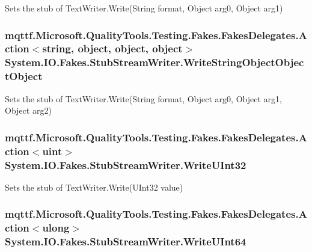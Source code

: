 Sets the stub of Text\-Writer.\-Write(\-String format, Object arg0, Object arg1)

\hypertarget{class_system_1_1_i_o_1_1_fakes_1_1_stub_stream_writer_a1e194a47418a0f3d83e321dcdd96c2c2}{
\subsubsection[{Write\-String\-Object\-Object\-Object}]{\setlength{\rightskip}{0pt plus 5cm}mqttf.\-Microsoft.\-Quality\-Tools.\-Testing.\-Fakes.\-Fakes\-Delegates.\-Action$<$string, object, object, object$>$ System.\-I\-O.\-Fakes.\-Stub\-Stream\-Writer.\-Write\-String\-Object\-Object\-Object}}\label{class_system_1_1_i_o_1_1_fakes_1_1_stub_stream_writer_a1e194a47418a0f3d83e321dcdd96c2c2}


Sets the stub of Text\-Writer.\-Write(\-String format, Object arg0, Object arg1, Object arg2)

\hypertarget{class_system_1_1_i_o_1_1_fakes_1_1_stub_stream_writer_a0367a489a38d479170440cd913568e6a}{
\subsubsection[{Write\-U\-Int32}]{\setlength{\rightskip}{0pt plus 5cm}mqttf.\-Microsoft.\-Quality\-Tools.\-Testing.\-Fakes.\-Fakes\-Delegates.\-Action$<$uint$>$ System.\-I\-O.\-Fakes.\-Stub\-Stream\-Writer.\-Write\-U\-Int32}}\label{class_system_1_1_i_o_1_1_fakes_1_1_stub_stream_writer_a0367a489a38d479170440cd913568e6a}


Sets the stub of Text\-Writer.\-Write(\-U\-Int32 value)

\hypertarget{class_system_1_1_i_o_1_1_fakes_1_1_stub_stream_writer_a85808941f821d1819c9f096b431c385d}{
\subsubsection[{Write\-U\-Int64}]{\setlength{\rightskip}{0pt plus 5cm}mqttf.\-Microsoft.\-Quality\-Tools.\-Testing.\-Fakes.\-Fakes\-Delegates.\-Action$<$ulong$>$ System.\-I\-O.\-Fakes.\-Stub\-Stream\-Writer.\-Write\-U\-Int64}}\label{class_system_1_1_i_o_1_1_fakes_1_1_stub_stream_writer_a85808941f821d1819c9f096b431c385d}


